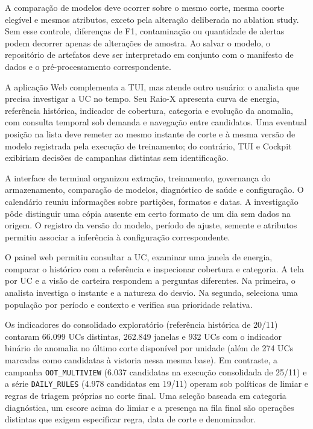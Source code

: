 A comparação de modelos deve ocorrer sobre o mesmo corte, mesma coorte elegível e mesmos atributos, exceto pela alteração deliberada no ablation study. Sem esse controle, diferenças de F1, contaminação ou quantidade de alertas podem decorrer apenas de alterações de amostra. Ao salvar o modelo, o repositório de artefatos deve ser interpretado em conjunto com o manifesto de dados e o pré-processamento correspondente.

A aplicação Web complementa a TUI, mas atende outro usuário: o analista que precisa investigar a UC no tempo. Seu Raio-X apresenta curva de energia, referência histórica, indicador de cobertura, categoria e evolução da anomalia, com consulta temporal sob demanda e navegação entre candidatos. Uma eventual posição na lista deve remeter ao mesmo instante de corte e à mesma versão de modelo registrada pela execução de treinamento; do contrário, TUI e Cockpit exibiriam decisões de campanhas distintas sem identificação.


A interface de terminal organizou extração, treinamento, governança do armazenamento, comparação de modelos, diagnóstico de saúde e configuração. O calendário reuniu informações sobre partições, formatos e datas. A investigação pôde distinguir uma cópia ausente em certo formato de um dia sem dados na origem. O registro da versão do modelo, período de ajuste, semente e atributos permitiu associar a inferência à configuração correspondente.

O painel web permitiu consultar a UC, examinar uma janela de energia, comparar o histórico com a referência e inspecionar cobertura e categoria. A tela por UC e a visão de carteira respondem a perguntas diferentes. Na primeira, o analista investiga o instante e a natureza do desvio. Na segunda, seleciona uma população por período e contexto e verifica sua prioridade relativa.

Os indicadores do consolidado exploratório (referência histórica de 20/11) contaram 66.099 UCs distintas, 262.849 janelas e 932 UCs com o indicador binário de anomalia no último corte disponível por unidade (além de 274 UCs marcadas como candidatas à vistoria nessa mesma base). Em contraste, a campanha \texttt{OOT\_MULTIVIEW} (6.037 candidatas na execução consolidada de 25/11) e a série \texttt{DAILY\_RULES} (4.978 candidatas em 19/11) operam sob políticas de limiar e regras de triagem próprias no corte final. Uma seleção baseada em categoria diagnóstica, um escore acima do limiar e a presença na fila final são operações distintas que exigem especificar regra, data de corte e denominador.



